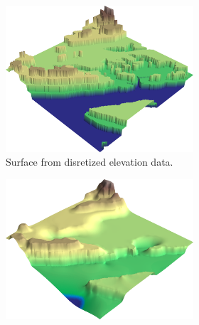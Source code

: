 \documentclass[a4paper,10pt]{report}
\begin{document}
\begin{figure}[H]
    \centering
    \begin{subfigure}{\textwidth}
        \begin{subfigure}{.49\textwidth}
        \centering
            \includegraphics[width=\textwidth]{../images/NH52/2D_Data_Interpolation_3D_discretized_datagrid.png}
        \renewcommand\thesubfigure{\alph{subfigure}) i}
        \caption{Surface from disretized elevation data.}
        \end{subfigure}
        \hfill
        \begin{subfigure}{.49\textwidth}
            \includegraphics[width=\textwidth]{../images/NH52/2D_Data_Interpolation_3D_discretized_datagrid_interpolated.png}

\end{subfigure}
\end{subfigure}
\end{figure}
\end{document}
